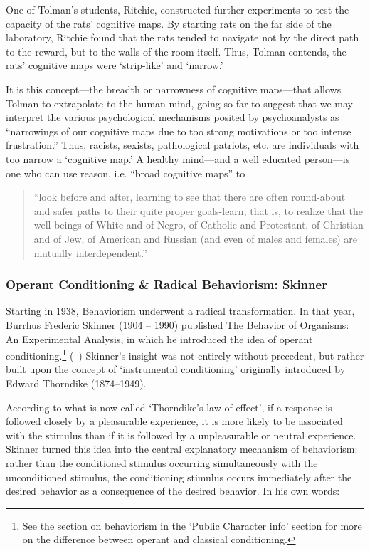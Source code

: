 \begin{refsection}
One of Tolman's students, Ritchie, constructed further experiments to test the capacity of the rats' cognitive maps. By starting rats on the far side of the laboratory, Ritchie found that the rats tended to navigate not by the direct path to the reward, but to the walls of the room itself. Thus, Tolman contends, the rats' cognitive maps were `strip-like' and `narrow.'

It is this concept---the breadth or narrowness of cognitive maps---that allows Tolman to extrapolate to the human mind, going so far to suggest that we may interpret the various psychological mechanisms posited by psychoanalysts as ``narrowings of our cognitive maps due to too strong motivations or too intense frustration.'' Thus, racists, sexists, pathological patriots, etc. are individuals with too narrow a `cognitive map.' A healthy mind---and a well educated person---is one who can use reason, i.e. ``broad cognitive maps'' to

\begin{quote}

``look before and after, learning to see that there are often round-about and safer paths to their quite proper goals-learn, that is, to realize that the well-beings of White and of Negro, of Catholic and Protestant, of Christian and of Jew, of American and Russian (and even of males and females) are mutually interdependent.'' ~\citep[p. 208]{Tolman:1948ty}
\end{quote}

\subsubsection{Operant Conditioning \& Radical Behaviorism: Skinner}
\label{operantconditioningradicalbehaviorism:skinner}

Starting in 1938, Behaviorism underwent a radical transformation. In that year, Burrhus Frederic Skinner (1904 – 1990) published The Behavior of Organisms: An Experimental Analysis, in which he introduced the idea of operant conditioning.\footnote{See the section on behaviorism in the `Public Character info' section for more on the difference between operant and classical conditioning.} (~\citep{York:tqkKlD3E}) Skinner's insight was not entirely without precedent, but rather built upon the concept of `instrumental conditioning' originally introduced by Edward Thorndike (1874--1949). 

According to what is now called `Thorndike's law of effect', if a response is followed closely by a pleasurable experience, it is more likely to be associated with the stimulus than if it is followed by a unpleasurable or neutral experience. Skinner turned this idea into the central explanatory mechanism of behaviorism: rather than the conditioned stimulus occurring simultaneously with the unconditioned stimulus, the conditioning stimulus occurs immediately after the desired behavior as a consequence of the desired behavior. In his own words:


\end{refsection}
